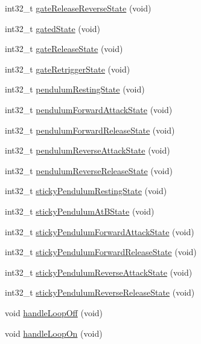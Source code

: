 \begin{DoxyCompactItemize}
\item 
int32\+\_\+t \mbox{\hyperlink{class_meta_controller_aee60552d4bbf1fd4087daa09419d57b0}{gate\+Release\+Reverse\+State}} (void)
\item 
int32\+\_\+t \mbox{\hyperlink{class_meta_controller_a7381643e084577e6c5dc2a49b37ffa3a}{gated\+State}} (void)
\item 
int32\+\_\+t \mbox{\hyperlink{class_meta_controller_af8205394c094350baa9f9f7fdd2fe29c}{gate\+Release\+State}} (void)
\item 
int32\+\_\+t \mbox{\hyperlink{class_meta_controller_aed970942a999d6877cc25908111d8d86}{gate\+Retrigger\+State}} (void)
\item 
int32\+\_\+t \mbox{\hyperlink{class_meta_controller_aa23c5bdc67442973a0bbcec0448ce6b1}{pendulum\+Resting\+State}} (void)
\item 
int32\+\_\+t \mbox{\hyperlink{class_meta_controller_abf6bdd57f10954b720d7ffa022b9a153}{pendulum\+Forward\+Attack\+State}} (void)
\item 
int32\+\_\+t \mbox{\hyperlink{class_meta_controller_ae19cd919a5c011b6f8d92db018e12ab5}{pendulum\+Forward\+Release\+State}} (void)
\item 
int32\+\_\+t \mbox{\hyperlink{class_meta_controller_a4a36b6e78f12343efa97f78f62a84961}{pendulum\+Reverse\+Attack\+State}} (void)
\item 
int32\+\_\+t \mbox{\hyperlink{class_meta_controller_ac0dfd31e6a44435ad874cf6cf9ce6cb9}{pendulum\+Reverse\+Release\+State}} (void)
\item 
int32\+\_\+t \mbox{\hyperlink{class_meta_controller_aa2d483666f462cd7463359e01884b0ed}{sticky\+Pendulum\+Resting\+State}} (void)
\item 
int32\+\_\+t \mbox{\hyperlink{class_meta_controller_a9d1d5e1874af5aaa313de79f8eda8ab8}{sticky\+Pendulum\+At\+B\+State}} (void)
\item 
int32\+\_\+t \mbox{\hyperlink{class_meta_controller_a93afa53f78656a0796a5e4b1fd3ced39}{sticky\+Pendulum\+Forward\+Attack\+State}} (void)
\item 
int32\+\_\+t \mbox{\hyperlink{class_meta_controller_a5acfa8ab673a41895e112430b0d49806}{sticky\+Pendulum\+Forward\+Release\+State}} (void)
\item 
int32\+\_\+t \mbox{\hyperlink{class_meta_controller_aa2b6e015a980cb21d1ab081cf860d9ca}{sticky\+Pendulum\+Reverse\+Attack\+State}} (void)
\item 
int32\+\_\+t \mbox{\hyperlink{class_meta_controller_a68d06e87f408205ffee85cab3560b54a}{sticky\+Pendulum\+Reverse\+Release\+State}} (void)
\item 
void \mbox{\hyperlink{class_meta_controller_aa585d038b9fdfab1eb5fff6e353b7ebe}{handle\+Loop\+Off}} (void)
\item 
void \mbox{\hyperlink{class_meta_controller_a52054c11063311316152e195a8982cd0}{handle\+Loop\+On}} (void)
\end{DoxyCompactItemize}
